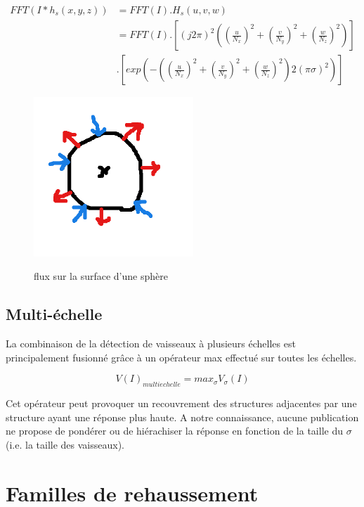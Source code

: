 \begin{align}
  FFT( I * h_s(x,y,z) ) &= FFT(I) . H_s(u,v,w) \\
                       &= FFT(I) . [ (j2 \pi)^2 ( (\frac{u}{N_x})^2 + (\frac{v}{N_y})^2 + (\frac{w}{N_z})^2 ) ] \\
                       & . [ exp( -( (\frac{u}{N_x})^2 + (\frac{v}{N_y})^2 + (\frac{w}{N_z})^2 ) 2(\pi\sigma)^2 ) ]
\end{align}

\begin{figure}
  \centering
  \includegraphics[height=6cm]{Images/flux.png}
  \label{fig:flux_sphere}
  \caption{flux sur la surface d'une sphère}
\end{figure}

\subsection{Multi-échelle}
\label{sec:EA:rehaussement:echelle:multiScale}


La combinaison de la détection de vaisseaux à plusieurs échelles est principalement fusionné grâce à un opérateur max effectué sur toutes les échelles.

\begin{equation}
  V(I)_{multi echelle} = max_{\sigma}V_{\sigma}(I)
\end{equation}

Cet opérateur peut provoquer un recouvrement des structures adjacentes par une structure ayant une réponse plus haute. A notre connaissance, aucune publication ne propose de pondérer ou de hiérachiser la réponse en fonction de la taille du $\sigma$ (i.e. la taille des vaisseaux).

\section{Familles de rehaussement}
\label{sec:EA:rehaussement:famille}

